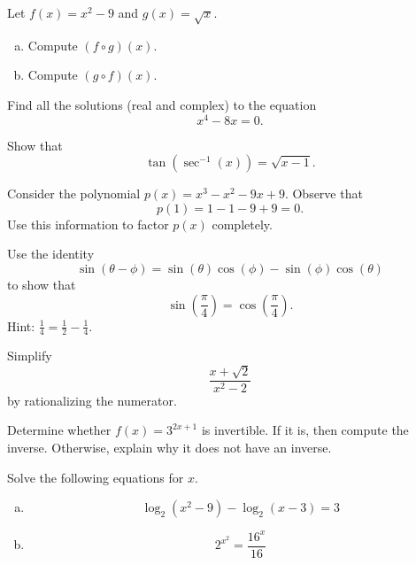 \documentclass[12pt]{amsart}
\begin{document}
\newpage

\begin{thm}[10 Points]\label{ex3}
  Let $f(x) = x^2 - 9$ and $g(x) = \sqrt{x}$.
  \begin{enumerate}[(a)]
  \item
    Compute $(f \circ g)(x)$.
    \vspace{2in}
  \item
    Compute $(g \circ f)(x)$.
    \vspace{2in}
  \end{enumerate}
\end{thm}

\newpage

\begin{thm}[10 Points]
	Find all the solutions (real and complex) to the equation 
	$$x^4 - 8x = 0.$$
	\vspace{3in}
\end{thm}

\newpage

\begin{thm}[10 Points]
  Show that
  $$\tan\left(\sec^{-1}(x)\right) = \sqrt{x - 1}.$$
\end{thm}

\newpage

\begin{thm}[10 Points]
	Consider the polynomial $p(x) = x^3 - x^2 - 9x + 9$.
	Observe that 
	$$p(1) = 1 - 1 - 9 + 9 = 0.$$
	Use this information to factor $p(x)$ completely.
	\vspace{3.5in}
\end{thm}

\newpage

\begin{thm}[10 Points]
	Use the identity
        $$\sin(\theta - \phi) = \sin(\theta)\cos(\phi) - \sin(\phi)\cos(\theta)$$
	to show that
	$$\sin\left(\frac{\pi}{4}\right) = \cos\left(\frac{\pi}{4}\right).$$
        Hint: $\frac{1}{4} = \frac{1}{2} - \frac{1}{4}.$
\end{thm}

\newpage

\begin{thm}[10 Points]
	Simplify 
	$$\frac{x + \sqrt{2}}{x^2 - 2}$$
	by rationalizing the numerator.
	\vspace{3in}
\end{thm}

\newpage

\begin{thm}[10 Points]\label{ex4}
  Determine whether $f(x) = 3^{2x + 1}$ is invertible.
  If it is, then compute the inverse.  
  Otherwise, explain why it does not have an inverse.
\end{thm}

\newpage

\begin{thm}[10 Points]\label{ex5}
  Solve the following equations for $x$.
  \begin{enumerate}[(a)]
  \item
    $$\log_2(x^2 - 9) - \log_2(x - 3) = 3$$
    \vspace{3.5in}
  \item
    $$2^{x^2} = \frac{16^{x}}{16}$$
  \end{enumerate}
\end{thm}
\end{document}
